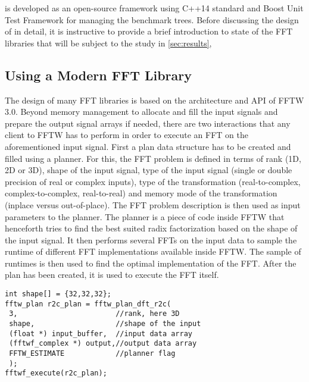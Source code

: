 

\gearshifft{} is developed as an open-source framework using C++14 standard and Boost Unit Test Framework for managing the benchmark trees. Before discussing the design of \gearshifft{} in detail, it is instructive to provide a brief introduction to state of the FFT libraries that will be subject to the study in \cref{sec:results},

\subsection{Using a Modern FFT Library}
\label{ssec:modern_ffts}

The design of many FFT libraries is based on the architecture and API of FFTW $3.0$. Beyond memory management to allocate and fill the input signals and prepare the output signal arrays if needed, there are two interactions that any client to FFTW has to perform in order to execute an FFT on the aforementioned input signal. First a plan data structure has to be created and filled using a planner. For this, the FFT problem is defined in terms of rank (1D, 2D or 3D), shape of the input signal, type of the input signal (single or double precision of real or complex inputs), type of the transformation (real-to-complex, complex-to-complex, real-to-real) and memory mode of the transformation (inplace versus out-of-place). The FFT problem description is then used as input parameters to the planner. The planner is a piece of code inside FFTW that henceforth tries to find the best suited radix factorization based on the shape of the input signal. It then performs several FFTs on the input data to sample the runtime of different FFT implementations available inside FFTW. The sample of runtimes is then used to find the optimal implementation of the FFT. After the plan has been created, it is used to execute the FFT itself.

\begin{lstlisting}[caption={Minimal usage example of the FFTW single precision real-to-complex planner API. Memory management is omitted.},label={lst:fftw_example}]
int shape[] = {32,32,32};
fftw_plan r2c_plan = fftw_plan_dft_r2c(
 3,                       //rank, here 3D 
 shape,                   //shape of the input
 (float *) input_buffer,  //input data array
 (fftwf_complex *) output,//output data array
 FFTW_ESTIMATE            //planner flag
 );
fftwf_execute(r2c_plan);
\end{lstlisting}

